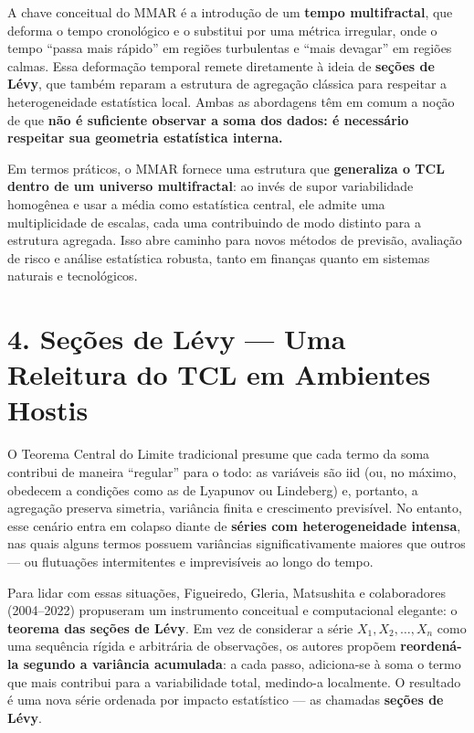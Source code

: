 \documentclass[
]{agujournal2019}
\begin{document}
A chave conceitual do MMAR é a introdução de um \textbf{tempo
multifractal}, que deforma o tempo cronológico e o substitui por uma
métrica irregular, onde o tempo ``passa mais rápido'' em regiões
turbulentas e ``mais devagar'' em regiões calmas. Essa deformação
temporal remete diretamente à ideia de \textbf{seções de Lévy}, que
também reparam a estrutura de agregação clássica para respeitar a
heterogeneidade estatística local. Ambas as abordagens têm em comum a
noção de que \textbf{não é suficiente observar a soma dos dados: é
necessário respeitar sua geometria estatística interna.}

Em termos práticos, o MMAR fornece uma estrutura que \textbf{generaliza
o TCL dentro de um universo multifractal}: ao invés de supor
variabilidade homogênea e usar a média como estatística central, ele
admite uma multiplicidade de escalas, cada uma contribuindo de modo
distinto para a estrutura agregada. Isso abre caminho para novos métodos
de previsão, avaliação de risco e análise estatística robusta, tanto em
finanças quanto em sistemas naturais e tecnológicos.

\section{4. Seções de Lévy --- Uma Releitura do TCL em Ambientes
Hostis}\label{seuxe7uxf5es-de-luxe9vy-uma-releitura-do-tcl-em-ambientes-hostis}

O Teorema Central do Limite tradicional presume que cada termo da soma
contribui de maneira ``regular'' para o todo: as variáveis são iid (ou,
no máximo, obedecem a condições como as de Lyapunov ou Lindeberg) e,
portanto, a agregação preserva simetria, variância finita e crescimento
previsível. No entanto, esse cenário entra em colapso diante de
\textbf{séries com heterogeneidade intensa}, nas quais alguns termos
possuem variâncias significativamente maiores que outros --- ou
flutuações intermitentes e imprevisíveis ao longo do tempo.

Para lidar com essas situações, Figueiredo, Gleria, Matsushita e
colaboradores (2004--2022) propuseram um instrumento conceitual e
computacional elegante: o \textbf{teorema das seções de Lévy}. Em vez de
considerar a série \(X_1, X_2, \dots, X_n\) como uma sequência rígida e
arbitrária de observações, os autores propõem \textbf{reordená-la
segundo a variância acumulada}: a cada passo, adiciona-se à soma o termo
que mais contribui para a variabilidade total, medindo-a localmente. O
resultado é uma nova série ordenada por impacto estatístico --- as
chamadas \textbf{seções de Lévy}.
\end{document}
